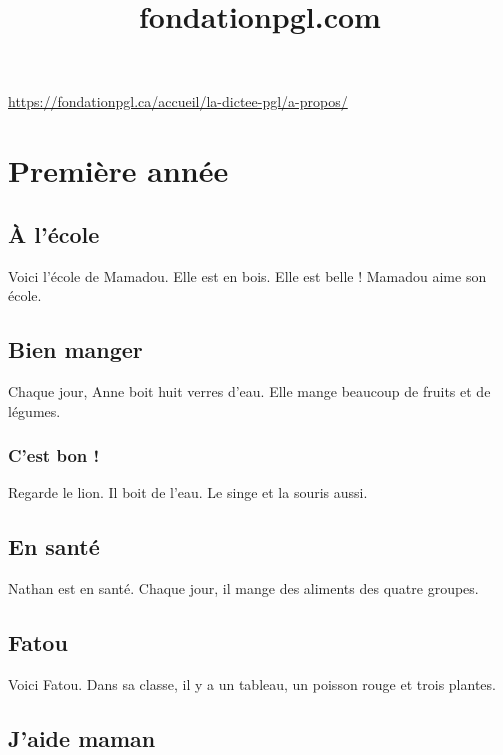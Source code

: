 \documentclass[11pt, french]{article}
\title{fondationpgl.com}
\begin{document}
\maketitle

\url{https://fondationpgl.ca/accueil/la-dictee-pgl/a-propos/}

\tableofcontents

\vfill



\section{Première année}

\subsection{À l'école}

Voici l'école de Mamadou. Elle est en bois. Elle est belle ! Mamadou
aime son école.

\subsection{Bien manger}

Chaque jour, Anne boit huit verres d'eau. Elle mange beaucoup de
fruits et de légumes.

\subsubsection{C'est bon !}

Regarde le lion. Il boit de l'eau. Le singe et la souris aussi.

\subsection{En santé}

Nathan est en santé. Chaque jour, il mange des aliments des quatre
groupes.

\subsection{Fatou}

Voici Fatou. Dans sa classe, il y a un tableau, un poisson rouge et
trois plantes.

\subsection{J'aide maman}
\end{document}
